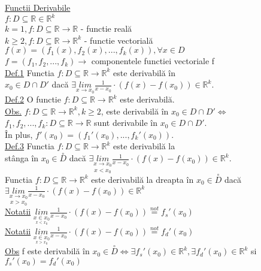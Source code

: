 \documentclass[12pt]{extarticle}
\begin{document}
	\huge \underline{Functii Derivabile} \\
	{\large
		$f : D \subseteq \mathbb{R} \in \mathbb{R}^{k}$ \\
		$k = 1, f : D \subseteq \mathbb{R} \to \mathbb{R}$ - functie reală \\
		$k \geq 2, f : D \subseteq \mathbb{R} \to \mathbb{R}^{k}$ - functie vectorială \\
		$f(x) = (f_{1}(x), f_{2}(x), ..., f_{k}(x)), \forall x \in D$ \\
		$f = (f_{1}, f_{2}, ..., f_{k}) \to$ componentele functiei vectoriale f \\
		\underline{Def.1} Functia $f : D \subseteq \mathbb{R} \to \mathbb{R}^{k}$ este derivabilă în \\
		$x_{0} \in D \cap D'$ dacă $\exists \underset{x \to x_{0}}{lim}\frac{1}{x - x_{0}} \cdot (f(x) - f(x_{0})) \in \mathbb{R}^{k}$. \\
		\underline{Def.2} O functie $f : D \subseteq \mathbb{R} \to \mathbb{R}^{k}$ este derivabilă. \\
		\underline{Obs.} $f : D \subseteq \mathbb{R} \to \mathbb{R}^{k}, k \geq 2$, este derivabilă în $x_{0} \in D \cap D' \Leftrightarrow$ \\
		$f_{1}, f_{2}, ..., f_{k} : D \subseteq \mathbb{R} \to \mathbb{R}$ sunt derivabile în $x_{0} \in D \cap D'$. \\
		În plus, $f'(x_{0}) = (f_{1}'(x_{0}), ..., f_{k}'(x_{0}))$. \\
		\underline{Def.3} Functia $f : D \subseteq \mathbb{R} \to \mathbb{R}^{k}$ este derivabilă la \\
		stânga în $x_{0} \in \overset{\circ}{D}$ dacă $\exists \underset{x < x_{0}}{\underset{x \to x_{0}}{lim}}\frac{1}{x - x_{0}} \cdot (f(x) - f(x_{0})) \in \mathbb{R}^{k}$.\\
		Functia $f : D \subseteq \mathbb{R} \to \mathbb{R}^{k}$ este derivabilă la dreapta în $x_{0} \in \overset{\circ}{D}$ dacă $\exists \underset{x > x_{0}}{\underset{x \to x_{0}}{lim}}\frac{1}{x - x_{0}} \cdot (f(x) - f(x_{0})) \in \mathbb{R}^{k}$ \\
		\underline{Notatii} $\underset{\underset{x < x_{0}}{x \in x_{0}}}{lim}\frac{1}{x - x_{0}} \cdot (f(x) - f(x_{0})) \overset{not}{=} f_{s}'(x_{0})$ \\
		\underline{Notatii} $\underset{\underset{x > x_{0}}{x \in x_{0}}}{lim}\frac{1}{x - x_{0}} \cdot (f(x) - f(x_{0})) \overset{not}{=} f_{d}'(x_{0})$ \\
		\underline{Obs} f este derivabilă în $x_{0} \in \overset{\circ}{D} \Leftrightarrow \exists f_{s}'(x_{0}) \in \mathbb{R}^{k}, \exists f_{d}'(x_{0}) \in \mathbb{R}^{k}$ si $f_{s}'(x_{0}) = f_{d}'(x_{0})$ \\
	}
\end{document}
